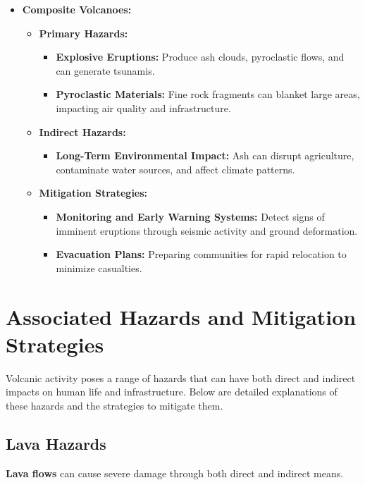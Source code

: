 \documentclass{article}
\begin{document}
\begin{itemize}[leftmargin=*, label={--}]
    \item \textbf{Composite Volcanoes:}
    \begin{itemize}[leftmargin=*, label={$\bullet$}]
        \item \textbf{Primary Hazards:}
        \begin{itemize}[leftmargin=*, label={--}]
            \item \textbf{Explosive Eruptions:} Produce ash clouds, pyroclastic flows, and can generate tsunamis.
            \item \textbf{Pyroclastic Materials:} Fine rock fragments can blanket large areas, impacting air quality and infrastructure.
        \end{itemize}
        \item \textbf{Indirect Hazards:}
        \begin{itemize}[leftmargin=*, label={--}]
            \item \textbf{Long-Term Environmental Impact:} Ash can disrupt agriculture, contaminate water sources, and affect climate patterns.
        \end{itemize}
        \item \textbf{Mitigation Strategies:}
        \begin{itemize}[leftmargin=*, label={--}]
            \item \textbf{Monitoring and Early Warning Systems:} Detect signs of imminent eruptions through seismic activity and ground deformation.
            \item \textbf{Evacuation Plans:} Preparing communities for rapid relocation to minimize casualties.
        \end{itemize}
    \end{itemize}
\end{itemize}

\section{Associated Hazards and Mitigation Strategies}
Volcanic activity poses a range of hazards that can have both direct and indirect impacts on human life and infrastructure. Below are detailed explanations of these hazards and the strategies to mitigate them.

\subsection{Lava Hazards}
\textbf{Lava flows} can cause severe damage through both direct and indirect means.
\end{document}
